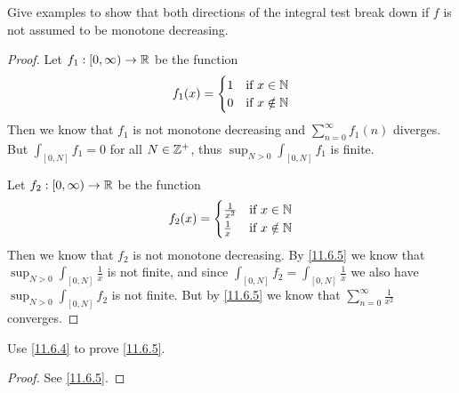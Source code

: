 \begin{ex}\label{ex:11.6.4}
  Give examples to show that both directions of the integral test break down if \(f\) is not assumed to be monotone decreasing.
\end{ex}

\begin{proof}
  Let \(f_1 : [0, \infty) \to \mathbb{R}\) be the function
  \[
    f_1(x) = \begin{cases}
      1 & \text{if } x \in \mathbb{N}    \\
      0 & \text{if } x \notin \mathbb{N}
    \end{cases}
  \]
  Then we know that \(f_1\) is not monotone decreasing and \(\sum_{n = 0}^\infty f_1(n)\) diverges.
  But \(\int_{[0, N]} f_1 = 0\) for all \(N \in \mathbb{Z}^+\), thus \(\sup_{N > 0} \int_{[0, N]} f_1\) is finite.

  Let \(f_2 : [0, \infty) \to \mathbb{R}\) be the function
  \[
    f_2(x) = \begin{cases}
      \frac{1}{x^2} & \text{if } x \in \mathbb{N}    \\
      \frac{1}{x}   & \text{if } x \notin \mathbb{N}
    \end{cases}
  \]
  Then we know that \(f_2\) is not monotone decreasing.
  By \cref{11.6.5} we know that \(\sup_{N > 0} \int_{[0, N]} \frac{1}{x}\) is not finite, and since \(\int_{[0, N]} f_2 = \int_{[0, N]} \frac{1}{x}\) we also have \(\sup_{N > 0} \int_{[0, N]} f_2\) is not finite.
  But by \cref{11.6.5} we know that \(\sum_{n = 0}^\infty \frac{1}{x^2}\) converges.
\end{proof}

\begin{ex}\label{ex:11.6.5}
  Use \cref{11.6.4} to prove \cref{11.6.5}.
\end{ex}

\begin{proof}
  See \cref{11.6.5}.
\end{proof}